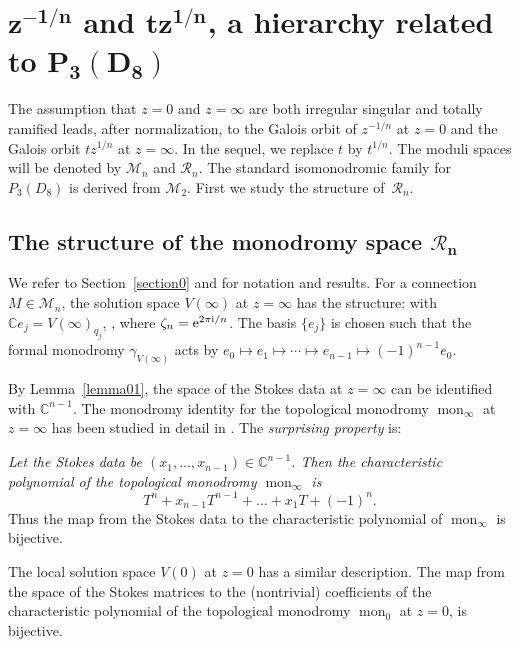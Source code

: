 \documentclass[10pt,a4paper]{amsart}
\numberwithin{equation}{section}
\begin{document}
\section[1/(n-th root z) and t*(n-th root z), a hierarchy related to P3(D8)]{$\boldsymbol{z^{-1/n}}$ and $\boldsymbol{tz^{1/n}}$, a hierarchy related to $\boldsymbol{P_3(D_8)}$}\label{twelve}

The assumption that $z=0$ and $z=\infty$ are both irregular singular and totally ramified leads, after normalization, to the Galois orbit
of $z^{-1/n}$ at $z=0$ and the Galois orbit $tz^{1/n}$ at $z=\infty$. In the sequel, we replace $t$ by $t^{1/n}$. The moduli spaces will
be denoted by $\mathcal{M}_n$ and $\mathcal{R}_n$. The standard isomonodromic family for $P_3(D_8)$ is derived from
$\mathcal{M}_2$. First we study the structure of~$\mathcal{R}_n$.


\subsection[The structure of the monodromy space R\_n]{The structure of the monodromy space $\boldsymbol{\mathcal{R}_n}$}
We refer to Section~\ref{section0} and \cite[Sections~8 and 9]{vdP-Si} for notation and results.
 For a connection $M\in \mathcal{M}_n$, the solution space $V(\infty)$ at $z=\infty$ has the
 structure:
  with $\mathbb{C}e_j= V(\infty)_{q_j}$,
 ,
 where $\zeta_n={\rm e}^{2\pi {\rm i}/n}$. The basis $\{e_j\}$ is chosen such that the formal monodromy $\gamma_{V(\infty)}$
 acts by $e_0\mapsto e_1 \mapsto \cdots \mapsto e_{n-1}\mapsto (-1)^{n-1}e_0$.

 By Lemma~\ref{lemma01}, the space of the Stokes data at $z=\infty$ can be identified with $\mathbb{C}^{n-1}$.
 The monodromy identity for the topological monodromy $\operatorname{mon}_\infty$ at $z=\infty$ has been studied
in detail in \cite[pp.~146--147]{CM-vdP}. The {\it surprising property} is:

 {\it Let the Stokes data be $(x_1,\dots ,x_{n-1})\in \mathbb{C}^{n-1}$. Then the characteristic polynomial
 of the topological monodromy $\operatorname{mon}_{\infty}$ is} \[ T^n+x_{n-1}T^{n-1}+\dots +x_1T+(-1)^{n}.\]
 Thus the map from the Stokes data to the characteristic polynomial of $\operatorname{mon}_\infty$ is bijective.

The local solution space $V(0)$ at $z=0$ has a similar description. The map
from the space of the Stokes matrices to the (nontrivial) coefficients of the characteristic polynomial of the topological monodromy $\operatorname{mon}_0$ at $z=0$, is bijective.
\end{document}
